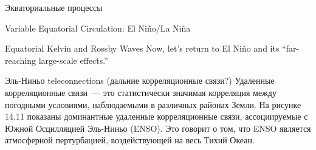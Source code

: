 \begin{chapter}{Экваториальные процессы}
\begin{section}{Variable Equatorial Circulation: El Ni\~{n}o/La Ni\~{n}a}
\begin{paragraph}{Equatorial Kelvin and Rossby Waves}
Now, let's return to El Ni\~{n}o and its ``far-reaching large-scale
effects.''
%
\end{paragraph}
\end{section}

\begin{section}{Эль-Ниньо teleconnections (дальние корреляционные связи?)}
Удаленные корреляционные связи~--- это статистически значимая
корреляция между погодными условиями, наблюдаемыми в различных районах
Земли. На рисунке 14.11 показаны доминантные удаленные корреляционные
связи, ассоциируемые с Южной Осцилляцией Эль-Ниньо (ENSO). Это говорит
о том, что ENSO является атмосферной пертурбацией, воздействующей на
весь Тихий Океан.
%


\end{section}
\end{chapter}
